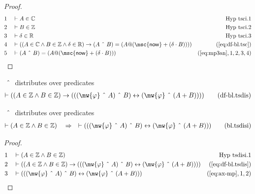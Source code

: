 \begin{proof}
\begin{align}
  1 &&  & \vdash A \in \mathbb{C}&\text{Hyp~tsci.1}\notag%
  \\ 2 &&  & \vdash B \in \mathbb{Z}&\text{Hyp~tsci.2}\notag%
  \\ 3 &&  & \vdash \delta \in \mathbb{R}&\text{Hyp~tsci.3}\notag%
  \\ 4 &&  & \vdash ( ( A \in \mathbb{C} \wedge B \in \mathbb{Z} \wedge \delta \in \mathbb{R} ) \rightarrow ( A ~\string^~ B ) = ( A @ ( \mathsf{\msc{now}} + ( \delta \cdot B ) ) ) )&(\mbox{\ref{eq:df-bl.tsc}})\notag
  \\ 5 &&  & \vdash ( A ~\string^~ B ) = ( A @ ( \mathsf{\msc{now}} + ( \delta \cdot B ) ) )&(\mbox{\ref{eq:mp3an}},1,2,3,4)\notag
\end{align}
\end{proof}

\begin{metadefinition} $~\string^~$ distributes over
predicates
\begin{align}
\vdash ( ( A \in \mathbb{Z} \wedge B \in \mathbb{Z} ) \rightarrow ( ( (
    \mw{\varphi} ~\string^~ A ) ~\string^~ B ) \leftrightarrow ( \mw{\varphi}
    ~\string^~ ( A + B ) ) ) )\label{eq:df-bl.tsdis}\tag{df-bl.tsdis}
\end{align}
\end{metadefinition}

\begin{lemma} $~\string^~$ distributes over predicates
\begin{align}
\vdash ( A \in \mathbb{Z} \wedge B \in \mathbb{Z} )\quad\Rightarrow\quad \vdash
    ( ( ( \mw{\varphi} ~\string^~ A ) ~\string^~ B ) \leftrightarrow (
    \mw{\varphi} ~\string^~ ( A + B ) ) )\label{eq:bl.tsdisi}\tag{bl.tsdisi}
\end{align}
\end{lemma}

\begin{proof}
\begin{align}
  1 &&  & \vdash ( A \in \mathbb{Z} \wedge B \in \mathbb{Z} )&\text{Hyp~tsdisi.1}\notag%
  \\ 2 &&  & \vdash ( ( A \in \mathbb{Z} \wedge B \in \mathbb{Z} ) \rightarrow ( ( ( \mw{\varphi} ~\string^~ A ) ~\string^~ B ) \leftrightarrow ( \mw{\varphi} ~\string^~ ( A + B ) ) ) )&(\mbox{\ref{eq:df-bl.tsdis}})\notag
  \\ 3 &&  & \vdash ( ( ( \mw{\varphi} ~\string^~ A ) ~\string^~ B ) \leftrightarrow ( \mw{\varphi} ~\string^~ ( A + B ) ) )&(\mbox{\ref{eq:ax-mp}},1,2)\notag
\end{align}
\end{proof}

